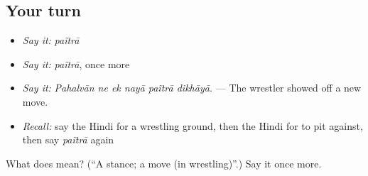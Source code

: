 \subsection*{Your turn}
\begin{itemize}
\raggedright
  \item \emph{Say it:} \emph{paĩtrā}
  \item \emph{Say it:} \emph{paĩtrā}, once more
  \item \emph{Say it:} \emph{Pahalvān ne ek nayā paĩtrā dikhāyā.} — The wrestler showed off a new move.
  \item \emph{Recall:} say the Hindi for a wrestling ground, then the Hindi for to pit against, then say \emph{paĩtrā} again
\end{itemize}

\begin{tcolorbox}[breakable,colback=teal!4,colframe=teal!35!black,title={Before you move on}]
What does  mean? (\textquotedblleft{}A stance; a move (in wrestling)\textquotedblright{}.) Say it once more.
\end{tcolorbox}
